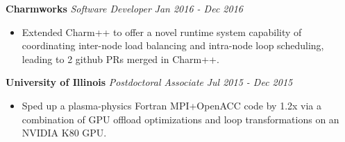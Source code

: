 \newcommand{\myExpSix}{

\item Extended Charm++ to offer a novel runtime system capability of coordinating inter-node load balancing and intra-node loop scheduling, leading to 2 github PRs merged in Charm++.


}
\noindent
\textbf{Charmworks}\hfill
\textit{Software Developer} \hfill \textit{Jan 2016 - Dec 2016} 
\begin{itemize}
\myExpSix

\end{itemize} 
\noindent
\textbf{University of Illinois}\hfill
\textit{Postdoctoral Associate} \hfill \textit{Jul 2015 - Dec 2015}
\begin{itemize}[itemsep=-0.1em]
\item Sped up a plasma-physics Fortran MPI+OpenACC code by 1.2x via a combination of GPU offload optimizations and loop transformations on an NVIDIA K80 GPU.
\end{itemize}